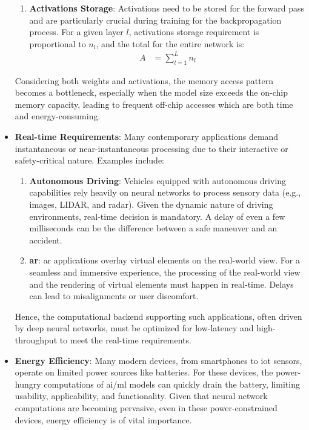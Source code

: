 \begin{itemize}
\begin{enumerate}
		\item \textbf{Activations Storage}: Activations need to be stored for the forward pass and are particularly crucial during training for the backpropagation process. For a given layer \(l\), activations storage requirement is proportional to \(n_l\), and the total for the entire network is:
		\begin{align*}
		A &= \sum_{l=1}^{L} n_l
		\end{align*}
	\end{enumerate}
	Considering both weights and activations, the memory access pattern becomes a bottleneck, especially when the model size exceeds the on-chip memory capacity, leading to frequent off-chip accesses which are both time and energy-consuming.
	
	\item \textbf{Real-time Requirements}:
	Many contemporary applications demand instantaneous or near-instantaneous processing due to their interactive or safety-critical nature. Examples include:
	
	\begin{enumerate}
		\item \textbf{Autonomous Driving}: Vehicles equipped with autonomous driving capabilities rely heavily on neural networks to process sensory data (e.g., images, LIDAR, and radar). Given the dynamic nature of driving environments, real-time decision is mandatory. A delay of even a few milliseconds can be the difference between a safe maneuver and an accident.
		
		\item \textbf{\gls{ar}}: \gls{ar} applications overlay virtual elements on the real-world view. For a seamless and immersive experience, the processing of the real-world view and the rendering of virtual elements must happen in real-time. Delays can lead to misalignments or user discomfort.
	\end{enumerate}
	
	Hence, the computational backend supporting such applications, often driven by deep neural networks, must be optimized for low-latency and high-throughput to meet the real-time requirements.
	
	\item \textbf{Energy Efficiency}: Many modern devices, from smartphones to \gls{iot} sensors, operate on limited power sources like batteries. For these devices, the power-hungry computations of \gls{ai}/\gls{ml} models can quickly drain the battery, limiting usability, applicability, and functionality. Given that neural network computations are becoming pervasive, even in these power-constrained devices, energy efficiency is of vital importance.
	

\end{itemize}
